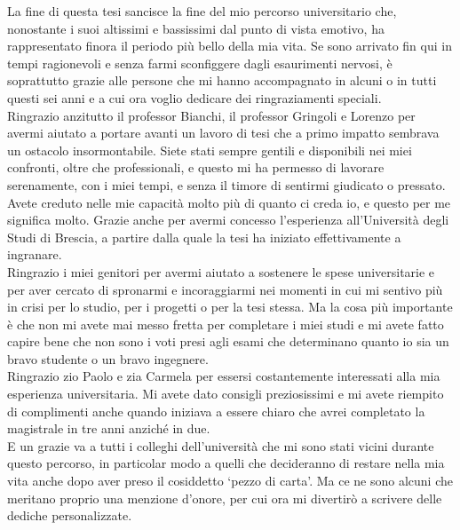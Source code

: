 \documentclass[10pt, oneside]{book}
\begin{document}
La fine di questa tesi sancisce la fine del mio percorso universitario che, nonostante i suoi altissimi e bassissimi dal punto di vista emotivo, ha rappresentato finora il periodo più bello della mia vita. Se sono arrivato fin qui in tempi ragionevoli e senza farmi sconfiggere dagli esaurimenti nervosi, è soprattutto grazie alle persone che mi hanno accompagnato in alcuni o in tutti questi sei anni e a cui ora voglio dedicare dei ringraziamenti speciali.\\

\noindent Ringrazio anzitutto il professor Bianchi, il professor Gringoli e Lorenzo per avermi aiutato a portare avanti un lavoro di tesi che a primo impatto sembrava un ostacolo insormontabile. Siete stati sempre gentili e disponibili nei miei confronti, oltre che professionali, e questo mi ha permesso di lavorare serenamente, con i miei tempi, e senza il timore di sentirmi giudicato o pressato. Avete creduto nelle mie capacità molto più di quanto ci creda io, e questo per me significa molto. Grazie anche per avermi concesso l'esperienza all'Università degli Studi di Brescia, a partire dalla quale la tesi ha iniziato effettivamente a ingranare.\\

\noindent Ringrazio i miei genitori per avermi aiutato a sostenere le spese universitarie e per aver cercato di spronarmi e incoraggiarmi nei momenti in cui mi sentivo più in crisi per lo studio, per i progetti o per la tesi stessa. Ma la cosa più importante è che non mi avete mai messo fretta per completare i miei studi e mi avete fatto capire bene che non sono i voti presi agli esami che determinano quanto io sia un bravo studente o un bravo ingegnere.\\

\noindent Ringrazio zio Paolo e zia Carmela per essersi costantemente interessati alla mia esperienza universitaria. Mi avete dato consigli preziosissimi e mi avete riempito di complimenti anche quando iniziava a essere chiaro che avrei completato la magistrale in tre anni anziché in due.\\

\noindent E un grazie va a tutti i colleghi dell'università che mi sono stati vicini durante questo percorso, in particolar modo a quelli che decideranno di restare nella mia vita anche dopo aver preso il cosiddetto `pezzo di carta'. Ma ce ne sono alcuni che meritano proprio una menzione d'onore, per cui ora mi divertirò a scrivere delle dediche personalizzate.\\
\end{document}
